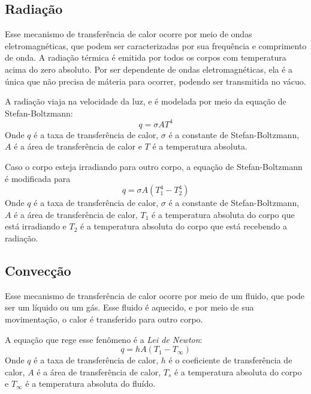 \subsection{Radiação}
Esse mecanismo de transferência de calor ocorre por meio de ondas eletromagnéticas, que podem ser
caracterizadas por sua frequência e comprimento de onda. A radiação térmica é emitida por todos os
corpos com temperatura acima do zero absoluto. Por ser dependente de ondas eletromagnéticas, ela é a
única que não precisa de máteria para ocorrer, podendo ser transmitida no vácuo. \par

A radiação viaja na velocidade da luz, e é modelada por meio da equação de Stefan-Boltzmann:
\begin{equation}\label{eq:stefan-boltzmann}
    q = \sigma A T^4
\end{equation}
Onde $q$ é a taxa de transferência de calor, $\sigma$ é a constante de Stefan-Boltzmann, $A$ é a
área de transferência de calor e $T$ é a temperatura absoluta. \par

Caso o corpo esteja irradiando para outro corpo, a equação de Stefan-Boltzmann é modificada para
\begin{equation}\label{eq:stefan-boltzmann2}
    q = \sigma A (T_1^4 - T_2^4)
\end{equation}
Onde $q$ é a taxa de transferência de calor, $\sigma$ é a constante de Stefan-Boltzmann, $A$ é a
área de transferência de calor, $T_1$ é a temperatura absoluta do corpo que está irradiando e $T_2$
é a temperatura absoluta do corpo que está recebendo a radiação. \par
\subsection{Convecção}
Esse mecanismo de transferência de calor ocorre por meio de um fluido, que pode ser um líquido ou
um gás. Esse fluido é aquecido, e por meio de sua movimentação, o calor é transferido para outro
corpo. \par

A equação que rege esse fenômeno é a \emph{Lei de Newton}:
\begin{equation}\label{eq:lei_newton}
    q = h A (T_1 - T_\infty )
\end{equation}
Onde $q$ é a taxa de transferência de calor, $h$ é o coeficiente de transferência de calor, $A$ é a
área de transferência de calor, $T_s$ é a temperatura absoluta do corpo e $T_\infty $ é a temperatura
absoluta do fluído. \par

